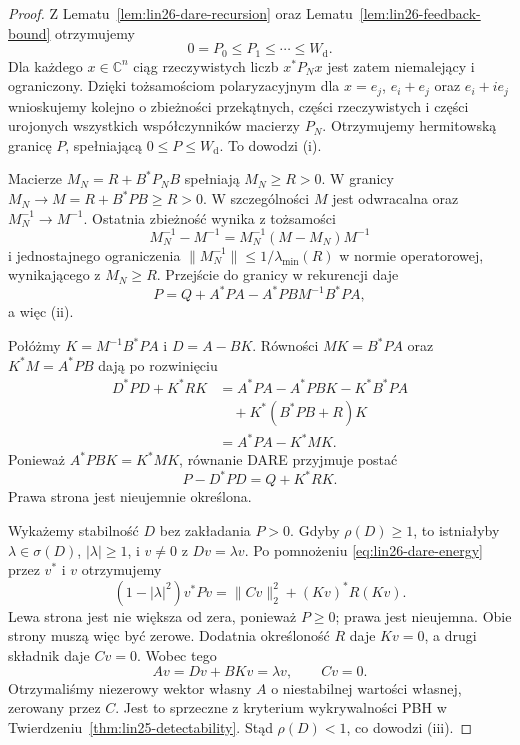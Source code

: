 \begin{proof}
Z Lematu~\ref{lem:lin26-dare-recursion}
oraz
Lematu~\ref{lem:lin26-feedback-bound}
otrzymujemy
\[
 0=P_0\le P_1\le\cdots
     \le W_{\mathrm d}.
\]
Dla każdego \(x\in\mathbb C^n\)
ciąg rzeczywistych liczb
\(x^*P_Nx\) jest zatem
niemalejący i ograniczony.
Dzięki tożsamościom
polaryzacyjnym dla
\(x=e_j\), \(e_i+e_j\)
oraz \(e_i+ie_j\)
wnioskujemy kolejno
o zbieżności przekątnych,
części rzeczywistych
i części urojonych
wszystkich współczynników
macierzy \(P_N\).
Otrzymujemy hermitowską
granicę \(P\), spełniającą
\(0\le P\le W_{\mathrm d}\).
To dowodzi (i).

Macierze
\(M_N=R+B^*P_NB\)
spełniają \(M_N\ge R>0\).
W granicy
\(M_N\to M=R+B^*PB\ge R>0\).
W szczególności
\(M\) jest odwracalna
oraz \(M_N^{-1}\to M^{-1}\).
Ostatnia zbieżność
wynika z tożsamości
\[
 M_N^{-1}-M^{-1}
 =M_N^{-1}(M-M_N)M^{-1}
\]
i jednostajnego ograniczenia
\(\|M_N^{-1}\|
 \le1/\lambda_{\min}(R)\)
w normie operatorowej,
wynikającego z
\(M_N\ge R\).
Przejście do granicy
w rekurencji daje
\[
 P=Q+A^*PA-A^*PBM^{-1}B^*PA,
\]
a więc (ii).

Połóżmy
\(K=M^{-1}B^*PA\)
i \(D=A-BK\).
Równości \(MK=B^*PA\)
oraz \(K^*M=A^*PB\)
dają po rozwinięciu
\[
 \begin{aligned}
 D^*PD+K^*RK
 &=A^*PA-A^*PBK-K^*B^*PA\\
 &\quad+K^*(B^*PB+R)K\\
 &=A^*PA-K^*MK.
 \end{aligned}
\]
Ponieważ
\(A^*PBK=K^*MK\),
równanie DARE
przyjmuje postać
\[
 P-D^*PD=Q+K^*RK.
 \tag{26.1}\label{eq:lin26-dare-energy}
\]
Prawa strona jest
nieujemnie określona.

Wykażemy stabilność \(D\)
bez zakładania \(P>0\).
Gdyby \(\rho(D)\ge1\),
to istniałyby
\(\lambda\in\sigma(D)\),
\(|\lambda|\ge1\),
i \(v\ne0\) z \(Dv=\lambda v\).
Po pomnożeniu
\eqref{eq:lin26-dare-energy}
przez \(v^*\) i \(v\)
otrzymujemy
\[
 (1-|\lambda|^2)v^*Pv
 =\|Cv\|_2^2
   +(Kv)^*R(Kv).
\]
Lewa strona jest nie większa
od zera, ponieważ \(P\ge0\);
prawa jest nieujemna.
Obie strony muszą więc
być zerowe. Dodatnia
określoność \(R\) daje
\(Kv=0\), a drugi składnik
daje \(Cv=0\).
Wobec tego
\[
 Av=Dv+BKv=\lambda v,
 \qquad Cv=0.
\]
Otrzymaliśmy niezerowy
wektor własny \(A\)
o niestabilnej wartości własnej,
zerowany przez \(C\).
Jest to sprzeczne z
kryterium wykrywalności PBH
w
Twierdzeniu~\ref{thm:lin25-detectability}.
Stąd \(\rho(D)<1\),
co dowodzi (iii).


\end{proof}
